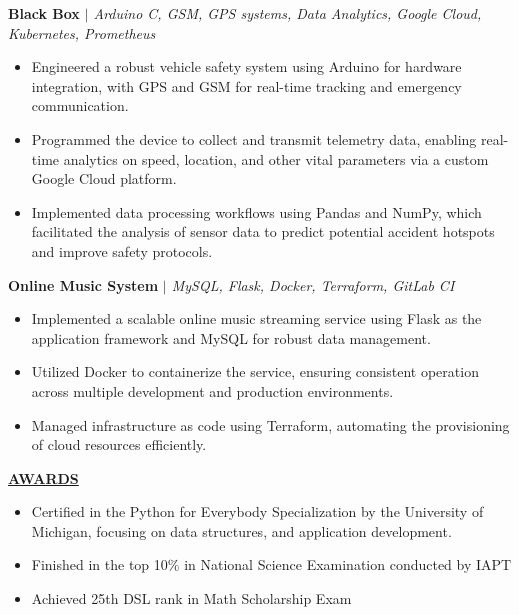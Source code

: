\documentclass{article}
\begin{document}
\noindent \textbf{Black Box} \textit{$\mid$ Arduino C, GSM, GPS systems, Data Analytics, Google Cloud, Kubernetes, Prometheus} \hfill \textbf{}
\begin{itemize}[noitemsep,nolistsep,leftmargin=*]
\item {\small Engineered a robust vehicle safety system using Arduino for hardware integration, with GPS and GSM for real-time tracking and emergency communication.}
\item {\small Programmed the device to collect and transmit telemetry data, enabling real-time analytics on speed, location, and other vital parameters via a custom Google Cloud platform.}
\item {\small Implemented data processing workflows using Pandas and NumPy, which facilitated the analysis of sensor data to predict potential accident hotspots and improve safety protocols.}
\end{itemize}

\noindent \textbf{Online Music System} \textit{$\mid$ MySQL, Flask, Docker, Terraform, GitLab CI} \hfill \textbf{}
\begin{itemize}[noitemsep,nolistsep,leftmargin=*]
\item {\small Implemented a scalable online music streaming service using Flask as the application framework and MySQL for robust data management.}
\item {\small Utilized Docker to containerize the service, ensuring consistent operation across multiple development and production environments.}
\item {\small Managed infrastructure as code using Terraform, automating the provisioning of cloud resources efficiently.}\\
\end{itemize}

\noindent \textbf{\underline{AWARDS}} 
\begin{itemize}[noitemsep,nolistsep,leftmargin=*]
\item {\small Certified in the Python for Everybody Specialization by the University of Michigan, focusing on data structures, and application development.}
\item {\small Finished in the top 10\% in National Science Examination conducted by IAPT}
\item {\small Achieved 25th DSL rank in Math Scholarship Exam}
\end{itemize}



\end{document}
